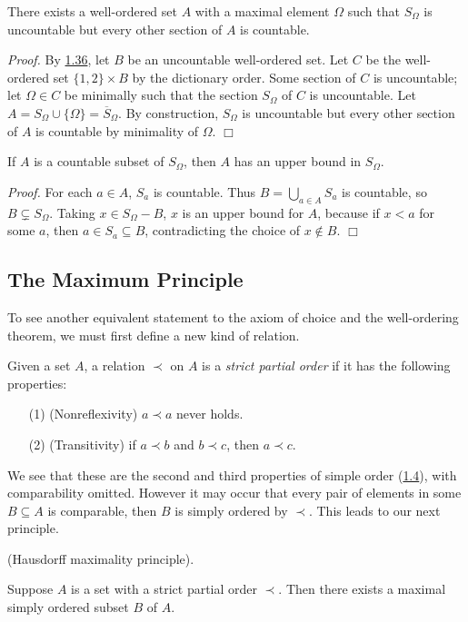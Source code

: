 \begin{lemma}\label{1.38}
    There exists a well-ordered set $A$ with a maximal element $\Omega$ such that $S_\Omega$ is uncountable but every other section of $A$ is countable.
\end{lemma}
    {\it Proof.} By \hyperref[1.36]{1.36}, let $B$ be an uncountable well-ordered set. Let $C$ be the well-ordered set $\{1, 2\} \times B$ by the dictionary order. Some section of $C$ is uncountable; let $\Omega \in C$ be minimally such that the section $S_\Omega$ of $C$ is uncountable. Let $A = S_\Omega \cup\{\Omega\} = \overline{S}_\Omega$. By construction, $S_\Omega$ is uncountable but every other section of $A$ is countable by minimality of $\Omega$. $\Box$

\begin{theorem}\label{1.39}
    If $A$ is a countable subset of $S_\Omega$, then $A$ has an upper bound in $S_\Omega$.
\end{theorem}

{\it Proof.} For each $a \in A$, $S_a$ is countable. Thus $B = \bigcup_{a \in A} S_a$ is countable, so $B \subsetneq S_\Omega$. Taking $x \in S_\Omega - B$, $x$ is an upper bound for $A$, because if $x< a$ for some $a$, then $a \in S_a \subseteq B$, contradicting the choice of $x \notin B$. $\Box$

\subsection{The Maximum Principle}
To see another equivalent statement to the axiom of choice and the well-ordering theorem, we must first define a new kind of relation.
\begin{definition}\label{1.40}
    Given a set $A$, a relation $\prec$ on $A$ is a {\it strict partial order} if it has the following properties:
    \begin{enumerate}
        \item[(1)] (Nonreflexivity) $a \prec a$ never holds.
        \item[(2)] (Transitivity) if $a \prec b$ and $b \prec c$, then $a \prec c$.
    \end{enumerate}
\end{definition}
We see that these are the second and third properties of simple order (\hyperref[1.4]{1.4}), with comparability omitted. However it may occur that every pair of elements in some $B \subseteq A$ is comparable, then $B$ is simply ordered by $\prec$. This leads to our next principle.
\begin{theorem}\label{1.41}
    (Hausdorff maximality principle).
    \vspace{10pt}

    Suppose $A$ is a set with a strict partial order $\prec$. Then there exists a maximal simply ordered subset $B$ of $A.$
\end{theorem}

